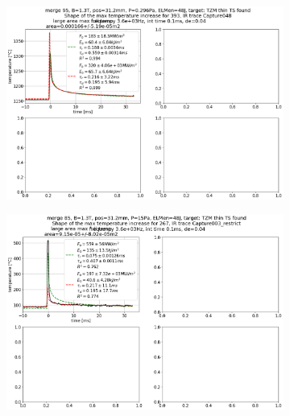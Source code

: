\begin{figure}
     \centering
     \begin{subfigure}{0.45\linewidth}
         \centering
         \includegraphics[width=\textwidth,trim={6 322 535 65.5},clip]{Chapters/chapter3/figs/file_index_393_IR_trace_Capture048_44.png}
         \vspace{-20mm}
         \caption{\phantom{wewwwwwwwwwww}}
         \label{fig:IR1a}
     \end{subfigure}
     \hfill
     \vspace*{+12mm}
     \hfill
     \centering
     \begin{subfigure}{0.45\linewidth}
         \centering
         \includegraphics[width=\textwidth,trim={6 322 535 65.5},clip]{Chapters/chapter3/figs/file_index_267_IR_trace_Capture003_restrict_44.png}

\end{subfigure}
\end{figure}
